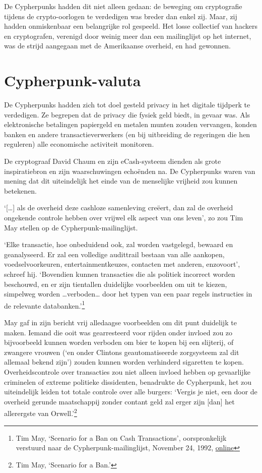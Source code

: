 \documentclass[
  a5paper,
  smalldemyvopaper,11pt,twoside,onecolumn,openright,extrafontsizes,
hidelinks]{memoir}
\begin{document}
De Cypherpunks hadden dit niet alleen gedaan: de beweging om
cryptografie tijdens de crypto-oorlogen te verdedigen was breder dan
enkel zij. Maar, zij hadden onmiskenbaar een belangrijke rol gespeeld.
Het losse collectief van hackers en cryptografen, verenigd door weinig
meer dan een mailinglijst op het internet, was de strijd aangegaan met
de Amerikaanse overheid, en had gewonnen.

\chapter{Cypherpunk-valuta}\label{cypherpunk-valuta}

De Cypherpunks hadden zich tot doel gesteld privacy in het digitale
tijdperk te verdedigen. Ze begrepen dat de privacy die fysiek geld
biedt, in gevaar was. Als elektronische betalingen papiergeld en metalen
munten zouden vervangen, konden banken en andere transactieverwerkers
(en bij uitbreiding de regeringen die hen reguleren) alle economische
activiteit monitoren.

De cryptograaf David Chaum en zijn eCash-systeem dienden als grote
inspiratiebron en zijn waarschuwingen echoënden na. De Cypherpunks waren
van mening dat dit uiteindelijk het einde van de menselijke vrijheid zou
kunnen betekenen.

`{[}\ldots{]} als de overheid deze cashloze samenleving creëert, dan zal
de overheid ongekende controle hebben over vrijwel elk aspect van ons
leven', zo zou Tim May stellen op de Cypherpunk-mailinglijst.

`Elke transactie, hoe onbeduidend ook, zal worden vastgelegd, bewaard en
geanalyseerd. Er zal een volledige audittrail bestaan van alle aankopen,
voedselvoorkeuren, entertainmentkeuzes, contacten met anderen,
enzovoort', schreef hij. `Bovendien kunnen transacties die als politiek
incorrect worden beschouwd, en er zijn tientallen duidelijke voorbeelden
om uit te kiezen, simpelweg worden \ldots verboden\ldots{} door het
typen van een paar regels instructies in de relevante
databanken.'\footnote{Tim May, `Scenario for a Ban on Cash
  Transactions', oorspronkelijk verstuurd naar de
  Cypherpunk-mailinglijst, November 24, 1992,
  \href{https://cypherpunks.venona.com/date/1992/11/msg00211.html}{online}}

May gaf in zijn bericht vrij alledaagse voorbeelden om dit punt
duidelijk te maken. Iemand die ooit was gearresteerd voor rijden onder
invloed zou zo bijvoorbeeld kunnen worden verboden om bier te kopen bij
een slijterij, of zwangere vrouwen (`en onder Clintons geautomatiseerde
zorgsysteem zal dit allemaal bekend zijn') zouden kunnen worden
verhinderd sigaretten te kopen. Overheidscontrole over transacties zou
niet alleen invloed hebben op gevaarlijke criminelen of extreme
politieke dissidenten, benadrukte de Cypherpunk, het zou uiteindelijk
leiden tot totale controle over alle burgers: `Vergis je niet, een door
de overheid gerunde maatschappij zonder contant geld zal erger zijn
{[}dan{]} het allerergste van Orwell.'\footnote{Tim May, `Scenario for a
  Ban.'}
\end{document}
